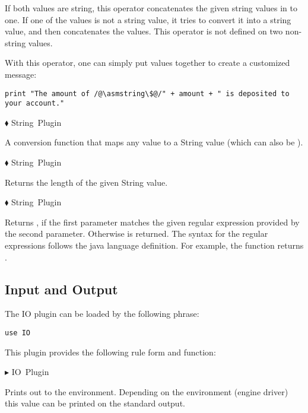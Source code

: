 \documentclass{article}
\makeatletter
\newcommand{\ruleform}[2]{\pform{$\blacktriangleright$}{#1}{#2}}
\newcommand{\funcform}[2]{\pform{$\blacklozenge$}{#1}{#2}}
\newcommand{\pform}[3]{\vspace*{4mm} \noindent #1 #2 \vspace{1mm}\textcolor[gray]{0.7}{\dotfill}\mbox{{\sffamily \footnotesize #3}}}
\newcommand{\indexrule}[1]{\index{#1 rule@\asm{#1} rule}}
\makeatother
\begin{document}
If both values are string, this operator concatenates the given string values in to one. If one of the values is not a string value, it tries to convert it into a string value, and then concatenates the values. This operator is not defined on two non-string values.

With this operator, one can simply put values together to create a customized message:

\begin{lstlisting}
print "The amount of /@\asmstring\$@/" + amount + " is deposited to your account."
\end{lstlisting}

\funcform{
}{String Plugin}

A conversion function that maps any value to a String value (which can also be ).

\funcform{
}{String Plugin}

Returns the length of the given String value.

\funcform{
}{String Plugin}

Returns , if the first parameter matches the given regular expression provided by the second parameter. Otherwise  is returned. The syntax for the regular expressions follows the java language definition. For example, the function  returns .

\subsection{Input and Output}
\label{io}

The IO plugin can be loaded by the following  phrase:

\begin{lstlisting}
use IO
\end{lstlisting}

\noindent This plugin provides the following rule form and function:

\ruleform{
}{IO Plugin}
\indexrule{print}

Prints out  to the environment. Depending on the environment (engine driver) this value can be printed on the standard output.
\end{document}
